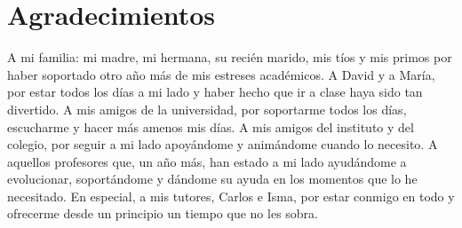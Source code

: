 
\chapter*{Agradecimientos}

A mi familia: mi madre, mi hermana, su recién marido, mis tíos y mis primos por haber soportado otro año más de mis estreses académicos.
A David y a María, por estar todos los días a mi lado y haber hecho que ir a clase haya sido tan divertido.
A mis amigos de la universidad, por soportarme todos los días, escucharme y hacer más amenos mis días.
A mis amigos del instituto y del colegio, por seguir a mi lado apoyándome y animándome cuando lo necesito.
A aquellos profesores que, un año más, han estado a mi lado ayudándome a evolucionar, soportándome y dándome su ayuda en los momentos que lo he necesitado.
En especial, a mis tutores, Carlos e Isma, por estar conmigo en todo y ofrecerme desde un principio un tiempo que no les sobra.